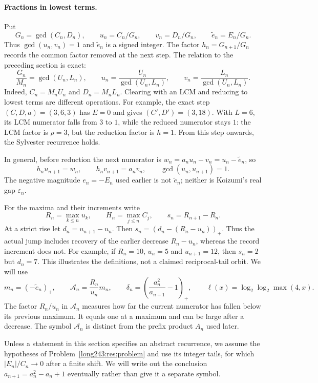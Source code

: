 \paragraph{Fractions in lowest terms.}
Put
\[
 G_n=\gcd(C_n,D_n),\qquad u_n=C_n/G_n,\qquad v_n=D_n/G_n,
 \qquad \tilde e_n=E_n/G_n.
\]
Thus $\gcd(u_n,v_n)=1$ and $\tilde e_n$ is a signed integer.
The factor $h_n=G_{n+1}/G_n$ records the common factor removed at the next
step. The relation to the preceding section is exact:
\[
 \frac{G_n}{M_n}=\gcd(U_n,L_n),\qquad
 u_n=\frac{U_n}{\gcd(U_n,L_n)},\qquad
 v_n=\frac{L_n}{\gcd(U_n,L_n)}.
\]
Indeed, $C_n=M_nU_n$ and $D_n=M_nL_n$.
Clearing with an LCM and reducing to lowest terms are different operations.
For example, the exact step $(C,D,a)=(3,6,3)$ has $E=0$ and gives
$(C',D')=(3,18)$. With $L=6$, its LCM numerator falls from $3$ to $1$,
while the reduced numerator stays $1$: the LCM factor is $\rho=3$,
but the reduction factor is $h=1$. From this step onwards, the Sylvester recurrence holds.

In general, before reduction the next numerator is
$w_n=a_nu_n-v_n=u_n-\tilde e_n$, so
\[
 h_nu_{n+1}=w_n,\qquad h_nv_{n+1}=a_nv_n,\qquad
 \gcd(u_n,u_{n+1})=1.
\]
The negative magnitude $e_n=-E_n$ used earlier is not $\tilde e_n$;
neither is Koizumi's real gap $\varepsilon_n$.

For the maxima and their increments write
\[
 R_n=\max_{k\le n}u_k,\qquad H_n=\max_{j\le n}C_j,
 \qquad s_n=R_{n+1}-R_n.
\]
At a strict rise let $d_n=u_{n+1}-u_n$. Then
$s_n=(d_n-(R_n-u_n))_+$. Thus the actual jump includes recovery of
the earlier decrease $R_n-u_n$, whereas the record increment does not. For example,
if $R_n=10$, $u_n=5$ and $u_{n+1}=12$, then $s_n=2$ but $d_n=7$.
This illustrates the definitions, not a claimed reciprocal-tail orbit.
We will use
\[
 m_n=(-\tilde e_n)_+,\qquad \mathcal A_n=\frac{R_n}{u_n}m_n,
 \qquad \delta_n=\left(\frac{a_n^2}{a_{n+1}}-1\right)_+,
 \qquad \ell(x)=\log_2\log_2\max(4,x).
\]
The factor $R_n/u_n$ in $\mathcal A_n$ measures how far the current
numerator has fallen below its previous maximum. It equals one at a
maximum and can be large after a decrease. The symbol $\mathcal A_n$
is distinct from the prefix product $A_n$ used later.

Unless a statement in this section specifies an abstract recurrence,
we assume the hypotheses of Problem~\ref{long243:res:problem} and use
its integer tails, for which $|E_n|/C_n\to0$ after a finite shift.
We will write out the conclusion $a_{n+1}=a_n^2-a_n+1$ eventually
rather than give it a separate symbol.

